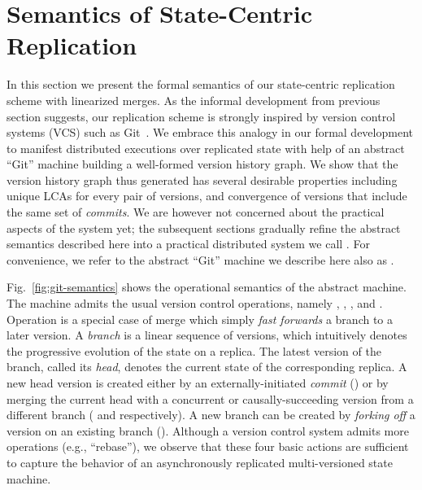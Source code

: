 \section{Semantics of State-Centric Replication}
\label{sec:vc-semantics}



In this section we present the formal semantics of our state-centric
replication scheme with linearized merges. As the informal development
from previous section suggests, our replication scheme is strongly
inspired by version control systems (VCS) such as Git~\cite{git}.  We
embrace this analogy in our formal development to manifest distributed
executions over replicated state with help of an abstract ``Git''
machine building a well-formed version history graph.  We show that
the version history graph thus generated has several desirable
properties including unique LCAs for every pair of versions, and
convergence of versions that include the same set of \emph{commits}.
We are however not concerned about the practical aspects of the system
yet; the subsequent sections gradually refine the abstract semantics
described here into a practical distributed system we call \quark. For
convenience, we refer to the abstract ``Git'' machine we describe here
also as \quark.

Fig.~\ref{fig:git-semantics} shows the operational semantics of the
\quark abstract machine. The machine admits the usual version control
operations, namely , ,
, and . Operation
 is a special case of merge which simply \emph{fast
forwards} a branch to a later version. A \emph{branch} is a linear
sequence of versions, which intuitively denotes the progressive
evolution of the state on a replica. The latest version of the branch,
called its \emph{head}, denotes the current state of the corresponding
replica. A new head version is created either by an
externally-initiated \emph{commit} () or by merging
the current head with a concurrent or causally-succeeding version from
a different branch ( and 
respectively). A new branch can be created by \emph{forking off} a
version on an existing branch (). Although a version
control system admits more operations (e.g., ``rebase''), we observe
that these four basic actions are sufficient to capture the behavior
of an asynchronously replicated multi-versioned state machine.

